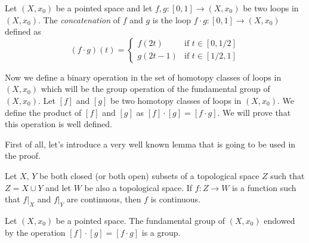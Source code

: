 \documentclass[12pt]{article}
\begin{document}
\begin{definition}
	Let \((X, x_0)\) be a pointed space and let \(f, g: [0,1] \rightarrow (X, x_0)\) be two loops in \((X, x_0)\). The \textit{concatenation} of \(f\) and \(g\) is the loop \(f \cdot g: [0,1] \rightarrow (X, x_0)\) defined as
	\begin{equation*}
		(f \cdot g)(t) = \begin{cases}
			f(2t) & \text{if } t \in [0, 1/2] \\
			g(2t-1) & \text{if } t \in [1/2, 1]
		\end{cases}
	\end{equation*}
\end{definition}

Now we define a binary operation in the set of homotopy classes of loops in \((X, x_0)\) which will be the group operation of the fundamental group of \((X, x_0)\). Let \([f]\) and \([g]\) be two homotopy classes of loops in \((X, x_0)\). We define the product of \([f]\) and \([g]\) as \([f] \cdot [g] = [f \cdot g]\). We will prove that this operation is well defined.

First of all, let's introduce a very well known lemma that is going to be used in the proof.

\begin{lemma}
	Let \(X\), \(Y\) be both closed (or both open) subsets of a topological space \(Z\) such that \(Z = X \cup Y\) and let \(W\) be also a topological space. If \(f: Z \rightarrow W\) is a function such that \(f|_X\) and \(f|_Y\) are continuous, then \(f\) is continuous.
	\label{lemma:pasting}
\end{lemma}

\begin{theorem}
	Let \((X, x_0)\) be a pointed space. The fundamental group of \((X, x_0)\) endowed by the operation \([f] \cdot [g] = [f \cdot g]\) is a group.
\end{theorem}
\end{document}
